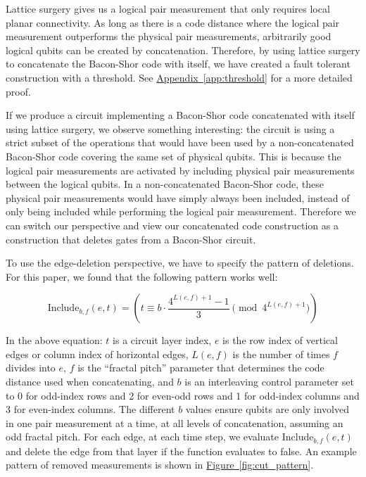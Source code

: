 \documentclass[onecolumn,unpublished,a4paper]{quantumarticle}
\theoremstyle{definition}
\theoremstyle{definition}
\theoremstyle{definition}
\DeclareRobustCommand{\app}[1]{\hyperref[app:#1]{Appendix~\ref*{app:#1}}}
\newcommand{\fig}[1]{\hyperref[fig:#1]{Figure~\ref*{fig:#1}}}
\begin{document}
Lattice surgery gives us a logical pair measurement that only requires local planar connectivity.
As long as there is a code distance where the logical pair measurement outperforms the physical pair measurements, arbitrarily good logical qubits can be created by concatenation.
Therefore, by using lattice surgery to concatenate the Bacon-Shor code with itself, we have created a fault tolerant construction with a threshold.
See \app{threshold} for a more detailed proof.

If we produce a circuit implementing a Bacon-Shor code concatenated with itself using lattice surgery, we observe something interesting: the circuit is using a strict subset of the operations that would have been used by a non-concatenated Bacon-Shor code covering the same set of physical qubits.
This is because the logical pair measurements are activated by including physical pair measurements between the logical qubits.
In a non-concatenated Bacon-Shor code, these physical pair measurements would have simply always been included, instead of only being included while performing the logical pair measurement.
Therefore we can switch our perspective and view our concatenated code construction as a construction that deletes gates from a Bacon-Shor circuit.

To use the edge-deletion perspective, we have to specify the pattern of deletions.
For this paper, we found that the following pattern works well:

$$\text{Include}_{b,f}(e, t) = \left(t \equiv b \cdot \frac{4^{L(e, f) + 1}-1}{3} \pmod {4^{L(e, f) + 1}}\right)$$

In the above equation: $t$ is a circuit layer index, $e$ is the row index of vertical edges or column index of horizontal edges, $L(e,f)$ is the number of times $f$ divides into $e$, $f$ is the ``fractal pitch'' parameter that determines the code distance used when concatenating, and $b$ is an interleaving control parameter set to 0 for odd-index rows and 2 for even-odd rows and 1 for odd-index columns and 3 for even-index columns.
The different $b$ values ensure qubits are only involved in one pair measurement at a time, at all levels of concatenation, assuming an odd fractal pitch.
For each edge, at each time step, we evaluate $\text{Include}_{b,f}(e, t)$ and delete the edge from that layer if the function evaluates to false.
An example pattern of removed measurements is shown in \fig{cut_pattern}.
\end{document}
